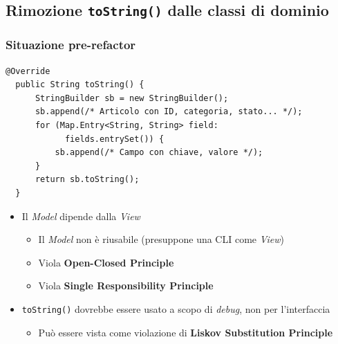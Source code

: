 \subsection{Rimozione \texttt{toString()} dalle classi di dominio}
\beamertitle

\begin{frame}[fragile]
  \frametitle{Situazione pre-refactor}
  \begin{lstlisting}[autogobble, title={\texttt{toString()} di \texttt{Article.java}}]
  @Override
  public String toString() {
      StringBuilder sb = new StringBuilder();
      sb.append(/* Articolo con ID, categoria, stato... */);
      for (Map.Entry<String, String> field:
            fields.entrySet()) {
          sb.append(/* Campo con chiave, valore */);
      }
      return sb.toString();
  }
  \end{lstlisting}

  \begin{itemize}
    \item Il \emph{Model} dipende dalla \emph{View}
    \begin{itemize}
      \item Il \emph{Model} non è riusabile (presuppone una CLI come \emph{View})
      \item Viola \textbf{Open-Closed Principle}
      \item Viola \textbf{Single Responsibility Principle}
    \end{itemize}
    \item \texttt{toString()} dovrebbe essere usato a scopo di \emph{debug}, non per l'interfaccia
    \begin{itemize}
      \item Può essere vista come violazione di \textbf{Liskov Substitution Principle}
    \end{itemize}
  \end{itemize}
\end{frame}

